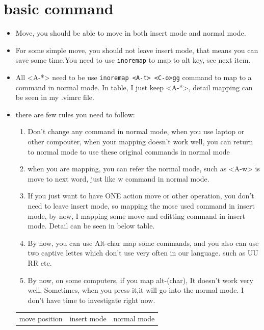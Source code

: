 \documentclass[a4paper,12pt,twoside]{book}
\begin{document}
\section{basic command}
	\begin{itemize}
	\item Move, you should be able to move in both insert mode and normal mode.
	\item For some simple move, you should not leave insert mode, that means you can save some time.You need to use \verb!inoremap! to map to alt key, see next item.

	\item All <A-*> need to be use \verb!inoremap <A-t> <C-o>gg! command to map to a command in normal mode. In table, I just keep <A-*>, detail mapping can be seen in my .vimrc file. 

	\item there are few rules you need to follow:
			\begin{enumerate}
					\item Don't change any command in normal mode, when you use laptop or other compouter, when your mapping doesn't work well, you can return to normal mode to use these original commands in normal mode
					\item when you are mapping, you can refer the normal mode, such as <A-w> is move to next word, just like w command in normal mode.
					\item If you just want to have ONE action move or other operation, you don't need to leave insert mode, so mapping the mose used command in insert mode, by now, I mapping some move and editting command in insert mode. Detail can be seen in below table.

					\item By now, you can use Alt-char map some commands, and you also can use two captive lettes which don't use very often in our language. such as UU RR etc. 
					\item By now, on some computers, if you map alt-(char), It doesn't work very well. Sometimes, when you press it,it will go into the normal mode. I don't have time to investigate right now. 
			\end{enumerate}


	\begin{center}
		\begin{tabular}{p{}|p{}|p{}}
		\hline 
        move position & insert mode & normal mode \\


\end{tabular}
\end{center}
\end{itemize}
\end{document}
